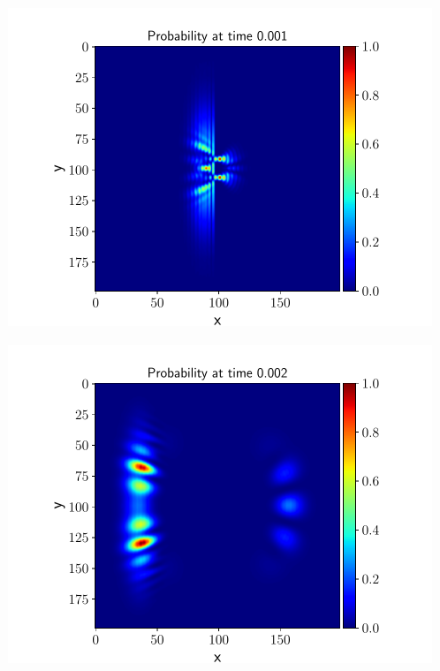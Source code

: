 \documentclass[english,notitlepage,reprint,nofootinbib]{revtex4-2}  %
\begin{document}
	\begin{figure}[h!]
		\centering
		\includegraphics[scale=0.55]{figures/prob_plot_0.001.pdf}
		\caption{}
		\label{fig:prob8_P1}
	\end{figure}

	\begin{figure}[h!]
		\centering
		\includegraphics[scale=0.55]{figures/prob_plot_0.002.pdf}
		\caption{}
		\label{fig:prob8_P2}
	\end{figure}
\end{document}
